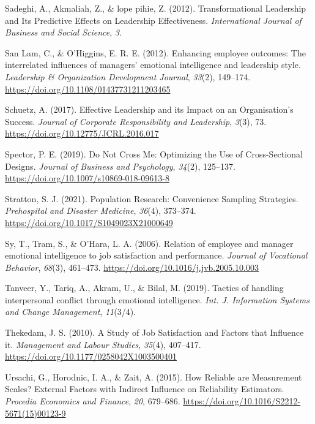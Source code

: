 \documentclass[
  man,
  longtable,
  nolmodern,
  notxfonts,
  notimes,
  colorlinks=true,linkcolor=blue,citecolor=blue,urlcolor=blue]{apa7}
\newlength{\cslhangindent}
\newenvironment{CSLReferences}[2] %
 {\begin{list}{}{%
  \setlength{\itemindent}{0pt}
  \setlength{\leftmargin}{0pt}
  \setlength{\parsep}{0pt}
  \ifodd #1
   \setlength{\leftmargin}{\cslhangindent}
   \setlength{\itemindent}{-1\cslhangindent}
  \fi
  \setlength{\itemsep}{#2\baselineskip}}}
 {\end{list}}
\begin{document}
\begin{CSLReferences}{1}{0}
Sadeghi, A., Akmaliah, Z., \& lope pihie, Z. (2012). Transformational
{Leadership} and {Its Predictive Effects} on {Leadership Effectiveness}.
\emph{International Journal of Business and Social Science}, \emph{3}.

San Lam, C., \& O'Higgins, E. R. E. (2012). Enhancing employee outcomes:
{The} interrelated influences of managers' emotional intelligence and
leadership style. \emph{Leadership \& Organization Development Journal},
\emph{33}(2), 149--174. \url{https://doi.org/10.1108/01437731211203465}

Schuetz, A. (2017). Effective {Leadership} and its {Impact} on an
{Organisation}'s {Success}. \emph{Journal of Corporate Responsibility
and Leadership}, \emph{3}(3), 73.
\url{https://doi.org/10.12775/JCRL.2016.017}

Spector, P. E. (2019). Do {Not Cross Me}: {Optimizing} the {Use} of
{Cross-Sectional Designs}. \emph{Journal of Business and Psychology},
\emph{34}(2), 125--137. \url{https://doi.org/10.1007/s10869-018-09613-8}

Stratton, S. J. (2021). Population {Research}: {Convenience Sampling
Strategies}. \emph{Prehospital and Disaster Medicine}, \emph{36}(4),
373--374. \url{https://doi.org/10.1017/S1049023X21000649}

Sy, T., Tram, S., \& O'Hara, L. A. (2006). Relation of employee and
manager emotional intelligence to job satisfaction and performance.
\emph{Journal of Vocational Behavior}, \emph{68}(3), 461--473.
\url{https://doi.org/10.1016/j.jvb.2005.10.003}

Tanveer, Y., Tariq, A., Akram, U., \& Bilal, M. (2019). Tactics of
handling interpersonal conflict through emotional intelligence.
\emph{Int. J. Information Systems and Change Management},
\emph{11}(3/4).

Thekedam, J. S. (2010). A {Study} of {Job Satisfaction} and {Factors}
that {Influence} it. \emph{Management and Labour Studies}, \emph{35}(4),
407--417. \url{https://doi.org/10.1177/0258042X1003500401}

Ursachi, G., Horodnic, I. A., \& Zait, A. (2015). How {Reliable} are
{Measurement Scales}? {External Factors} with {Indirect Influence} on
{Reliability Estimators}. \emph{Procedia Economics and Finance},
\emph{20}, 679--686. \url{https://doi.org/10.1016/S2212-5671(15)00123-9}


\end{CSLReferences}
\end{document}
